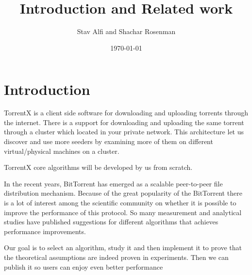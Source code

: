 \documentclass[11pt]{article}
\title{{\Huge   Introduction and Related work}}
\author{Stav Alfi and Shachar Rosenman}
\date{\today}
\begin{document}
  \maketitle

  \section*{Introduction}
  \begin{flushleft}

    TorrentX is a client side software for downloading and uploading torrents through the internet.
    There is a support for downloading and uploading the same torrent through a cluster which located in your private network. This architecture let us discover and use more seeders by examining more of them on different virtual/physical machines on a cluster.

  \end{flushleft}
  \begin{flushleft}

    TorrentX core algorithms will be developed by us from scratch.

  \end{flushleft}
  \begin{flushleft}

    In the recent years, BitTorrent has emerged as a scalable peer-to-peer file distribution mechanism.
    Because of the great popularity of the BitTorrent there is a lot of interest among the scientific community on whether it is possible to improve the performance of this protocol.
    So many measurement and analytical studies have published suggestions for different algorithms that achieves performance improvements.

  \end{flushleft}
  \begin{flushleft}

    Our goal is to select an algorithm, study it and then implement it to prove that the theoretical assumptions are indeed proven in experiments. Then we can publish it so users can enjoy even better performance
  \end{flushleft}
\end{document}
